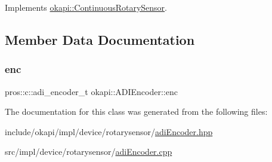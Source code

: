 Implements \mbox{\hyperlink{classokapi_1_1ContinuousRotarySensor_ae7268b0603097ac2d93a67e4fefa43e0}{okapi\+::\+Continuous\+Rotary\+Sensor}}.



\subsection{Member Data Documentation}
\mbox{\label{classokapi_1_1ADIEncoder_a73a94af6c2622b5cc8c30e6f99e20b44}} 
\subsubsection{\texorpdfstring{enc}{enc}}
{\footnotesize\ttfamily pros\+::c\+::adi\+\_\+encoder\+\_\+t okapi\+::\+A\+D\+I\+Encoder\+::enc\hspace{0.3cm}{\ttfamily [protected]}}



The documentation for this class was generated from the following files\+:\begin{DoxyCompactItemize}
\item 
include/okapi/impl/device/rotarysensor/\mbox{\hyperlink{adiEncoder_8hpp}{adi\+Encoder.\+hpp}}\item 
src/impl/device/rotarysensor/\mbox{\hyperlink{adiEncoder_8cpp}{adi\+Encoder.\+cpp}}\end{DoxyCompactItemize}
